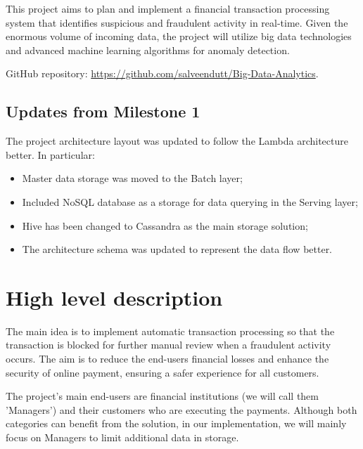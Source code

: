 \documentclass[12pt,a4paper, hidelinks]{article}
\begin{document}
This project aims to plan and implement a financial transaction processing system that identifies suspicious and fraudulent activity in real-time. Given the enormous volume of incoming data, the project will utilize big data technologies and advanced machine learning algorithms for anomaly detection.

GitHub repository: \href{https://github.com/salveendutt/Big-Data-Analytics}{https://github.com/salveendutt/Big-Data-Analytics}.

\subsection*{Updates from Milestone 1}
The project architecture layout was updated to follow the Lambda architecture better. In particular: 
\begin{itemize}
    \item Master data storage was moved to the Batch layer;
    \item Included NoSQL database as a storage for data querying in the Serving layer;
    \item Hive has been changed to Cassandra as the main storage solution;
    \item The architecture schema was updated to represent the data flow better. 
\end{itemize}


\section{High level description}

The main idea is to implement automatic transaction processing so that the transaction is blocked for further manual review when a fraudulent activity occurs. The aim is to reduce the end-users financial losses and enhance the security of online payment, ensuring a safer experience for all customers.

The project's main end-users are financial institutions (we will call them 'Managers') and their customers who are executing the payments. Although both categories can benefit from the solution, in our implementation, we will mainly focus on Managers to limit additional data in storage.
\end{document}
